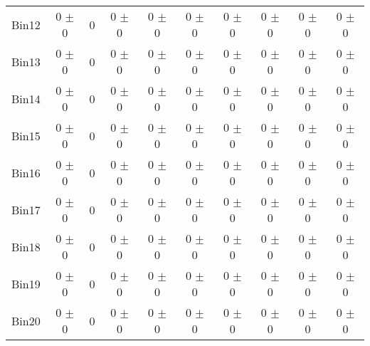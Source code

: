 \begin{tabular}{@{\extracolsep{4pt}}lccccccccc@{}}
     Bin12 & 0 $\pm$ 0 & 0 & 0 $\pm$ 0 & 0 $\pm$ 0 & 0 $\pm$ 0 & 0 $\pm$ 0 & 0 $\pm$ 0 & 0 $\pm$ 0 & 0 $\pm$ 0 \\ 
     Bin13 & 0 $\pm$ 0 & 0 & 0 $\pm$ 0 & 0 $\pm$ 0 & 0 $\pm$ 0 & 0 $\pm$ 0 & 0 $\pm$ 0 & 0 $\pm$ 0 & 0 $\pm$ 0 \\ 
     Bin14 & 0 $\pm$ 0 & 0 & 0 $\pm$ 0 & 0 $\pm$ 0 & 0 $\pm$ 0 & 0 $\pm$ 0 & 0 $\pm$ 0 & 0 $\pm$ 0 & 0 $\pm$ 0 \\ 
     Bin15 & 0 $\pm$ 0 & 0 & 0 $\pm$ 0 & 0 $\pm$ 0 & 0 $\pm$ 0 & 0 $\pm$ 0 & 0 $\pm$ 0 & 0 $\pm$ 0 & 0 $\pm$ 0 \\ 
     Bin16 & 0 $\pm$ 0 & 0 & 0 $\pm$ 0 & 0 $\pm$ 0 & 0 $\pm$ 0 & 0 $\pm$ 0 & 0 $\pm$ 0 & 0 $\pm$ 0 & 0 $\pm$ 0 \\ 
     Bin17 & 0 $\pm$ 0 & 0 & 0 $\pm$ 0 & 0 $\pm$ 0 & 0 $\pm$ 0 & 0 $\pm$ 0 & 0 $\pm$ 0 & 0 $\pm$ 0 & 0 $\pm$ 0 \\ 
     Bin18 & 0 $\pm$ 0 & 0 & 0 $\pm$ 0 & 0 $\pm$ 0 & 0 $\pm$ 0 & 0 $\pm$ 0 & 0 $\pm$ 0 & 0 $\pm$ 0 & 0 $\pm$ 0 \\ 
     Bin19 & 0 $\pm$ 0 & 0 & 0 $\pm$ 0 & 0 $\pm$ 0 & 0 $\pm$ 0 & 0 $\pm$ 0 & 0 $\pm$ 0 & 0 $\pm$ 0 & 0 $\pm$ 0 \\ 
     Bin20 & 0 $\pm$ 0 & 0 & 0 $\pm$ 0 & 0 $\pm$ 0 & 0 $\pm$ 0 & 0 $\pm$ 0 & 0 $\pm$ 0 & 0 $\pm$ 0 & 0 $\pm$ 0 \\ 
\hline\hline
  \end{tabular}
